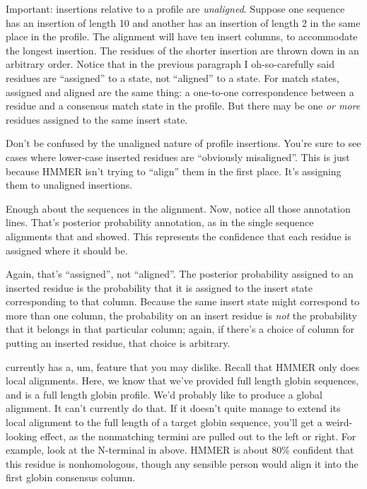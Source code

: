 Important: insertions relative to a profile are
\emph{unaligned}. Suppose one sequence has an insertion of length 10
and another has an insertion of length 2 in the same place in the
profile. The alignment will have ten insert columns, to accommodate the
longest insertion.  The residues of the shorter insertion are thrown
down in an arbitrary order.  Notice that in the previous paragraph I oh-so-carefully
said residues are ``assigned'' to a state, not ``aligned'' to a
state. For match states, assigned and aligned are the same thing: a
one-to-one correspondence between a residue and a consensus match
state in the profile. But there may be one \emph{or more} residues
assigned to the same insert state.

Don't be confused by the unaligned nature of profile 
insertions. You're sure to see cases where lower-case inserted
residues are ``obviously misaligned''.  This is just because HMMER
isn't trying to ``align'' them in the first place. It's assigning
them to unaligned insertions.

Enough about the sequences in the alignment. Now, notice all those
 annotation lines. That's posterior probability annotation,
as in the single sequence alignments that  and
 showed. This represents the confidence that each
residue is assigned where it should be.

Again, that's ``assigned'', not ``aligned''. The posterior probability
assigned to an inserted residue is the probability that it is assigned
to the insert state corresponding to that column. Because the same
insert state might correspond to more than one column, the probability
on an insert residue is \emph{not} the probability that it belongs in
that particular column; again, if there's a choice of column for
putting an inserted residue, that choice is arbitrary.

 currently has a, um, feature that you may dislike.
Recall that HMMER only does local alignments. Here, we know that we've
provided full length globin sequences, and  is a full
length globin profile. We'd probably like  to produce a
global alignment. It can't currently do that. If it doesn't quite
manage to extend its local alignment to the full length of a target
globin sequence, you'll get a weird-looking effect, as the nonmatching
termini are pulled out to the left or right. For example, look at the
N-terminal  in  above. HMMER is about 80\%
confident that this residue is nonhomologous, though any sensible
person would align it into the first globin consensus column.


